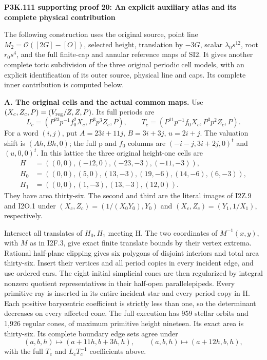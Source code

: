 \par\bigskip\noindent\textbf{P3K.111 supporting proof 20: An explicit auxiliary atlas and its complete physical contribution}\par\nobreak

The following construction uses the original source, point line
\(M_2=\mathcal O([2G]-[O])\), selected height, translation by \(-3G\),
scalar \(\lambda_0s^{12}\), root \(r_0s^4\), and the full finite-cap and
annular reference maps of SI2.  It gives another complete toric subdivision
of the three original periodic cell models, with an explicit identification
of its outer source, physical line and caps.  Its complete inner contribution
is computed below.

\medskip\noindent\textbf{A. The original cells and the actual common maps.}
Use \((X_c,Z_c,P)=(V_{\rm reg}/Z,Z,P)\).  Its full periods are
\[
 L_c=(P^{23}p^{-1}f_0^2X_c,P^3p^3Z_c,P),\qquad
 T_c=(P^{11}p^{-1}f_0X_c,P^3p^2Z_c,P).
\]
For a word \((i,j)\), put \(A=23i+11j\), \(B=3i+3j\),
\(u=2i+j\).  The valuation shift is \((Ah,Bh,0)\); the full p and
\(f_0\) columns are \((-i-j,3i+2j,0)^t\) and \((u,0,0)^t\).
In this lattice the three original height-one cells are
\[
\begin{split}
H&=((0,0),(-12,0),(-23,-3),(-11,-3)),\\
H_0&=((0,0),(5,0),(13,-3),(19,-6),(14,-6),(6,-3)),\\
H_1&=((0,0),(1,-3),(13,-3),(12,0)).
\end{split}
\]
They have area thirty-six.  The second and third are the literal images of
I2Z.9 and I2O.1 under
\((X_c,Z_c)=(1/(X_0Y_0),Y_0)\) and
\((X_c,Z_c)=(Y_1,1/X_1)\), respectively.

Intersect all translates of \(H_0,H_1\) meeting H.  The two coordinates of
\(M^{-1}(x,y)\), with \(M\) as in I2F.3, give exact finite translate bounds
by their vertex extrema.  Rational half-plane clipping gives six polygons
of disjoint interiors and total area thirty-six.  Insert their vertices and
all period copies in every incident edge, and use ordered ears.  The eight
initial simplicial cones are then regularized by integral nonzero quotient
representatives in their half-open parallelepipeds.  Every primitive ray is
inserted in its entire incident star and every period copy in H.  Each
positive barycentric coefficient is strictly less than one, so the
determinant decreases on every affected cone.  The full execution has 959
stellar orbits and 1,926 regular cones, of maximum primitive height nineteen.
Its exact area is thirty-six.  Its complete boundary edge sets agree under
\[
(a,b,h)\mapsto(a+11h,b+3h,h),\qquad
(a,b,h)\mapsto(a+12h,b,h),
\]
with the full \(T_c\) and \(L_cT_c^{-1}\) coefficients above.

